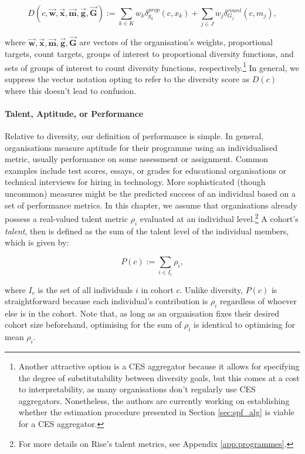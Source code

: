 \begin{equation}\label{eq:d_equation}
D(c,\vec{\mathbf{w}},\vec{\mathbf{x}},\vec{\mathbf{m}}, \vec{\mathbf{g}}, \vec{\mathbf{G}}) := \sum_{k\in K}w_k\delta_{g_k}^{prop}(c,x_k) + \sum_{j \in J}w_j\delta_{G_j}^{count}(c, m_j),
\end{equation}

\noindent where $\vec{\mathbf{w}},\vec{\mathbf{x}}, \vec{\mathbf{m}}, \vec{\mathbf{g}}, \vec{\mathbf{G}}$ are vectors of the organisation's weights, proportional targets, count targets, groups of interest to proportional diversity functions, and sets of groups of interest to count diversity functions, respectively.\footnote{Another attractive option is a CES aggregator because it allows for specifying the degree of substitutability between diversity goals, but this comes at a cost to interpretability, as many organisations don't regularly use CES aggregators. Nonetheless, the authors are currently working on establishing whether the estimation procedure presented in Section \ref{sec:spf_alg} is viable for a CES aggregator.} In general, we suppress the vector notation opting to refer to the diversity score as $D(c)$ where this doesn't lead to confusion.

\paragraph{Talent, Aptitude, or Performance} Relative to diversity, our definition of performance is simple. In general, organisations measure aptitude for their programme using an individualised metric, usually performance on some assessment or assignment. Common examples include test scores, essays, or grades for educational organisations or technical interviews for hiring in technology. More sophisticated (though uncommon) measures might be the predicted success of an individual based on a set of performance metrics. In this chapter, we assume that organisations already possess a real-valued talent metric $\rho_i$ evaluated at an individual level.\footnote{For more details on Rise's talent metrics, see Appendix \ref{app:programmes}.} A cohort's \emph{talent}, then is defined as the sum of the talent level of the individual members, which is given by:

\begin{equation}
P(c) := \sum_{i \in I_c}\rho_i,
\end{equation}

\noindent where $I_c$ is the set of all individuals $i$ in cohort $c$. Unlike diversity, $P(c)$ is straightforward because each individual's contribution is $\rho_i$ regardless of whoever else is in the cohort. Note that, as long as an organisation fixes their desired cohort size beforehand, optimising for the sum of $\rho_i$ is identical to optimising for mean $\rho_i$.

